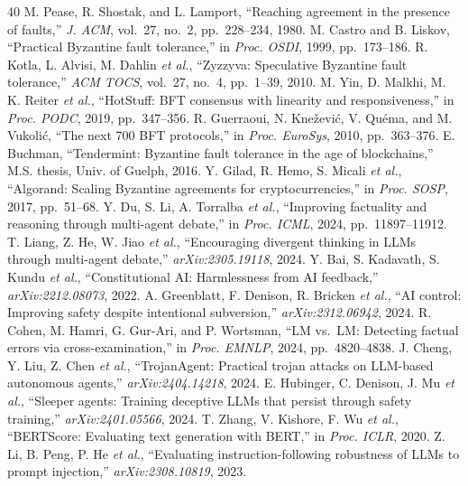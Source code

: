 \documentclass[journal,10pt]{IEEEtran}
\begin{document}
\begin{thebibliography}{40}
 M. Pease, R. Shostak, and L. Lamport, ``Reaching agreement in the presence of faults,'' \emph{J. ACM}, vol.~27, no.~2, pp.\ 228--234, 1980.
 M. Castro and B. Liskov, ``Practical Byzantine fault tolerance,'' in \emph{Proc. OSDI}, 1999, pp.\ 173--186.
 R. Kotla, L. Alvisi, M. Dahlin \emph{et al.}, ``Zyzzyva: Speculative Byzantine fault tolerance,'' \emph{ACM TOCS}, vol.~27, no.~4, pp.\ 1--39, 2010.
 M. Yin, D. Malkhi, M. K. Reiter \emph{et al.}, ``HotStuff: BFT consensus with linearity and responsiveness,'' in \emph{Proc. PODC}, 2019, pp.\ 347--356.
 R. Guerraoui, N. Kne\v{z}evi\'{c}, V. Qu\'{e}ma, and M. Vukoli\'{c}, ``The next 700 BFT protocols,'' in \emph{Proc. EuroSys}, 2010, pp.\ 363--376.
 E. Buchman, ``Tendermint: Byzantine fault tolerance in the age of blockchains,'' M.S. thesis, Univ. of Guelph, 2016.
 Y. Gilad, R. Hemo, S. Micali \emph{et al.}, ``Algorand: Scaling Byzantine agreements for cryptocurrencies,'' in \emph{Proc. SOSP}, 2017, pp.\ 51--68.
 Y. Du, S. Li, A. Torralba \emph{et al.}, ``Improving factuality and reasoning through multi-agent debate,'' in \emph{Proc. ICML}, 2024, pp.\ 11897--11912.
 T. Liang, Z. He, W. Jiao \emph{et al.}, ``Encouraging divergent thinking in LLMs through multi-agent debate,'' \emph{arXiv:2305.19118}, 2024.
 Y. Bai, S. Kadavath, S. Kundu \emph{et al.}, ``Constitutional AI: Harmlessness from AI feedback,'' \emph{arXiv:2212.08073}, 2022.
 A. Greenblatt, F. Denison, R. Bricken \emph{et al.}, ``AI control: Improving safety despite intentional subversion,'' \emph{arXiv:2312.06942}, 2024.
 R. Cohen, M. Hamri, G. Gur-Ari, and P. Wortsman, ``LM vs.\ LM: Detecting factual errors via cross-examination,'' in \emph{Proc. EMNLP}, 2024, pp.\ 4820--4838.
 J. Cheng, Y. Liu, Z. Chen \emph{et al.}, ``TrojanAgent: Practical trojan attacks on LLM-based autonomous agents,'' \emph{arXiv:2404.14218}, 2024.
 E. Hubinger, C. Denison, J. Mu \emph{et al.}, ``Sleeper agents: Training deceptive LLMs that persist through safety training,'' \emph{arXiv:2401.05566}, 2024.
 T. Zhang, V. Kishore, F. Wu \emph{et al.}, ``BERTScore: Evaluating text generation with BERT,'' in \emph{Proc. ICLR}, 2020.
 Z. Li, B. Peng, P. He \emph{et al.}, ``Evaluating instruction-following robustness of LLMs to prompt injection,'' \emph{arXiv:2308.10819}, 2023.

\end{thebibliography}
\end{document}
